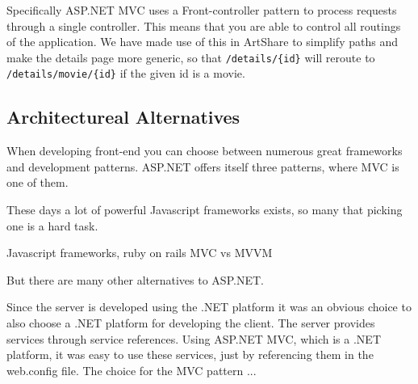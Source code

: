 \documentclass[../report.tex]{subfiles}
\begin{document}
Specifically ASP.NET MVC uses a Front-controller pattern to process requests through a single controller. This means that you are able to control all routings of the application. We have made use of this in ArtShare to simplify paths and make the details page more generic, so that \texttt{/details/\{id\}} will reroute to \texttt{/details/movie/\{id\}} if the given id is a movie.


\subsection{Architectureal Alternatives}

When developing front-end you can choose between numerous great frameworks and development patterns. ASP.NET offers itself three patterns, where MVC is one of them. 

These days a lot of powerful Javascript frameworks exists, so many that picking one is a hard task.  

Javascript frameworks, ruby on rails
MVC vs MVVM

But there are many other alternatives to ASP.NET. 

Since the server is developed using the .NET platform it was an obvious choice to also choose a .NET platform for developing the client. The server provides services through service references. Using ASP.NET MVC, which is a .NET platform, it was easy to use these services, just by referencing them in the web.config file. The choice for the MVC pattern ...
\end{document}
